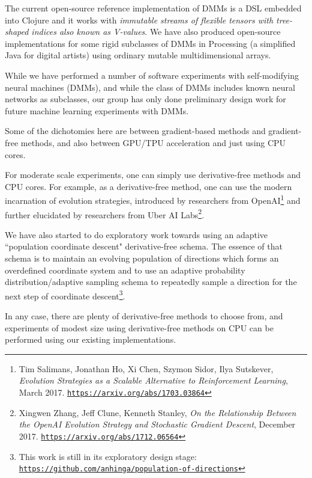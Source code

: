\documentclass{article}
\begin{document}
The current open-source reference implementation
of DMMs is a DSL embedded into Clojure and it works with {\em immutable streams of flexible tensors
with tree-shaped indices also known as V-values}. We have also produced open-source implementations
for some rigid subclasses of DMMs in Processing (a simplified Java for digital artists) using ordinary mutable
multidimensional arrays.

While we have performed a number of software experiments with self-modifying neural machines (DMMs),
and while the class of DMMs includes known neural networks as subclasses,
our group has only done preliminary design work for future machine learning experiments with DMMs.

Some of the dichotomies here are between gradient-based methods and gradient-free methods,
and also between GPU/TPU acceleration and just using CPU cores.

For moderate scale experiments, one can simply use derivative-free methods and CPU cores.
For example, as a derivative-free method, one can use the modern incarnation of evolution strategies, introduced by researchers from OpenAI\footnote{Tim Salimans, Jonathan Ho, Xi Chen, Szymon Sidor, Ilya Sutskever, {\em Evolution Strategies as a Scalable Alternative to Reinforcement Learning}, March 2017.
\href{https://arxiv.org/abs/1703.03864}{\tt https://arxiv.org/abs/1703.03864}}  and
further elucidated by researchers from Uber AI Labs\footnote{Xingwen Zhang, Jeff Clune, Kenneth Stanley,
{\em On the Relationship Between the OpenAI Evolution Strategy and Stochastic Gradient Descent}, December 2017.
\href{https://arxiv.org/abs/1712.06564}{\tt https://arxiv.org/abs/1712.06564}}. 

We have also started to do
exploratory work towards using an adaptive ``population coordinate descent" derivative-free schema. The essence of
that schema is to maintain an evolving
population of directions which forms an overdefined coordinate system and to use an adaptive probability distribution/adaptive
sampling schema to repeatedly sample a direction for the next step of coordinate descent\footnote{This work is
still in its exploratory design stage: 
\href{https://github.com/anhinga/population-of-directions}{\tt https://github.com/anhinga/population-of-directions}}.

In any case, there are plenty of derivative-free methods to choose from, and experiments of modest
size using derivative-free methods on CPU can be performed using our existing implementations.
\end{document}
